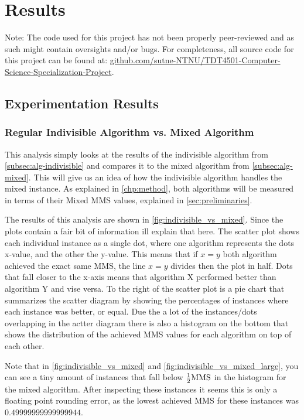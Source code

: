 \chapter{Results}\label{chp:results}

Note: The code used for this project has not been properly peer-reviewed and as such might contain oversights and/or bugs. For completeness, all source code for this project can be found at: \href{https://github.com/sutne-NTNU/TDT4501-Computer-Science-Specialization-Project/tree/main/code}{github.com/sutne-NTNU/TDT4501-Computer-Science-Specialization-Project}.

\section{Experimentation Results}

\subsection{Regular Indivisible Algorithm vs. Mixed Algorithm}

This analysis simply looks at the results of the indivisible algorithm from \autoref{subsec:alg-indivisible} and compares it to the mixed algorithm from \autoref{subsec:alg-mixed}. This will give us an idea of how the indivisible algorithm handles the mixed instance. As explained in \autoref{chp:method}, both algorithms will be measured in terms of their Mixed MMS values, explained in \autoref{sec:preliminaries}.

The results of this analysis are shown in \autoref{fig:indivisible_vs_mixed}. Since the plots contain a fair bit of information ill explain that here. The scatter plot shows each individual instance as a single dot, where one algorithm represents the dots x-value, and the other the y-value. This means that if $x=y$ both algorithm achieved the exact same MMS, the line $x=y$ divides then the plot in half. Dots that fall closer to the x-axis means that algorithm X performed better than algorithm Y and vise versa. To the right of the scatter plot is a pie chart that summarizes the scatter diagram by showing the percentages of instances where each instance was better, or equal. Due the a lot of the instances/dots overlapping in the actter diagram there is also a histogram on the bottom that shows the distribution of the achieved MMS values for each algorithm on top of each other.

Note that in \autoref{fig:indivisible_vs_mixed} and \autoref{fig:indivisible_vs_mixed_large}, you can see a tiny amount of instances that fall below $\frac{1}{2}\text{MMS}$ in the histogram for the mixed algorithm. After inspecting these instances it seems this is only a floating point rounding error, as the lowest achieved MMS for these instances was $0.49999999999999944$.

